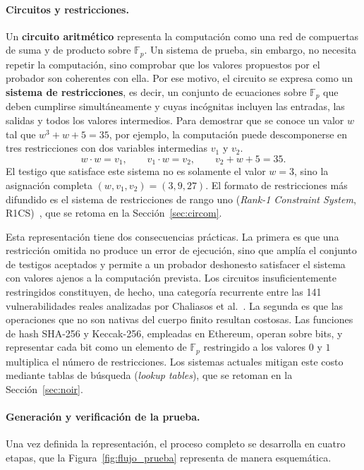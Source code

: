 \paragraph{Circuitos y restricciones.} Un \textbf{circuito aritmético} representa la
computación como una red de compuertas de suma y de producto sobre $\mathbb{F}_p$. Un sistema de
prueba, sin embargo, no necesita repetir la computación, sino comprobar que los valores
propuestos por el probador son coherentes con ella. Por ese motivo, el circuito se expresa como un
\textbf{sistema de restricciones}, es decir, un conjunto de ecuaciones sobre $\mathbb{F}_p$ que
deben cumplirse simultáneamente y cuyas incógnitas incluyen las entradas, las salidas y todos los
valores intermedios. Para demostrar que se conoce un valor $w$ tal que $w^{3} + w + 5 = 35$, por
ejemplo, la computación puede descomponerse en tres restricciones con dos variables intermedias
$v_1$ y $v_2$.
\begin{equation}
	w \cdot w = v_1, \qquad v_1 \cdot w = v_2, \qquad v_2 + w + 5 = 35 .
\end{equation}
El testigo que satisface este sistema no es solamente el valor $w = 3$, sino la asignación
completa $(w, v_1, v_2) = (3, 9, 27)$. El formato de restricciones más difundido es el sistema de
restricciones de rango uno (\textit{Rank-1 Constraint System}, R1CS)~\cite{parno2013pinocchio},
que se retoma en la Sección~\ref{sec:circom}.

Esta representación tiene dos consecuencias prácticas. La primera es que una restricción omitida
no produce un error de ejecución, sino que amplía el conjunto de testigos aceptados y permite a
un probador deshonesto satisfacer el sistema con valores ajenos a la computación prevista. Los
circuitos insuficientemente restringidos constituyen, de hecho, una categoría recurrente entre las
141 vulnerabilidades reales analizadas por Chaliasos et al.~\cite{chaliasos2024sok}. La segunda
es que las operaciones que no son nativas del cuerpo finito resultan costosas. Las funciones de
hash SHA-256 y Keccak-256, empleadas en Ethereum, operan sobre bits, y representar cada bit como
un elemento de $\mathbb{F}_p$ restringido a los valores $0$ y $1$ multiplica el número de
restricciones. Los sistemas actuales
mitigan este costo mediante tablas de búsqueda (\textit{lookup tables}), que se retoman en la
Sección~\ref{sec:noir}.

\paragraph{Generación y verificación de la prueba.} Una vez definida la representación, el
proceso completo se desarrolla en cuatro etapas, que la Figura~\ref{fig:flujo_prueba} representa
de manera esquemática.

